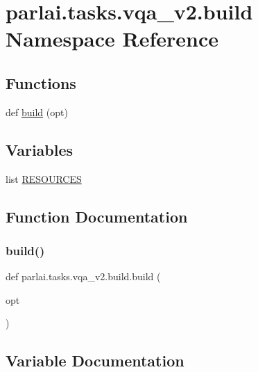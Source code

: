 \hypertarget{namespaceparlai_1_1tasks_1_1vqa__v2_1_1build}{}\section{parlai.\+tasks.\+vqa\+\_\+v2.\+build Namespace Reference}
\label{namespaceparlai_1_1tasks_1_1vqa__v2_1_1build}
\subsection*{Functions}
\begin{DoxyCompactItemize}
\item 
def \hyperlink{namespaceparlai_1_1tasks_1_1vqa__v2_1_1build_ad8bd5179304b2b092593e6876da288f9}{build} (opt)
\end{DoxyCompactItemize}
\subsection*{Variables}
\begin{DoxyCompactItemize}
\item 
list \hyperlink{namespaceparlai_1_1tasks_1_1vqa__v2_1_1build_ac1e1960570b2adec2d9f8d6cde301ac3}{R\+E\+S\+O\+U\+R\+C\+ES}
\end{DoxyCompactItemize}


\subsection{Function Documentation}
\mbox{\label{namespaceparlai_1_1tasks_1_1vqa__v2_1_1build_ad8bd5179304b2b092593e6876da288f9}} 
\subsubsection{\texorpdfstring{build()}{build()}}
{\footnotesize\ttfamily def parlai.\+tasks.\+vqa\+\_\+v2.\+build.\+build (\begin{DoxyParamCaption}\item[{}]{opt }\end{DoxyParamCaption})}



\subsection{Variable Documentation}
\mbox{\label{namespaceparlai_1_1tasks_1_1vqa__v2_1_1build_ac1e1960570b2adec2d9f8d6cde301ac3}} 

